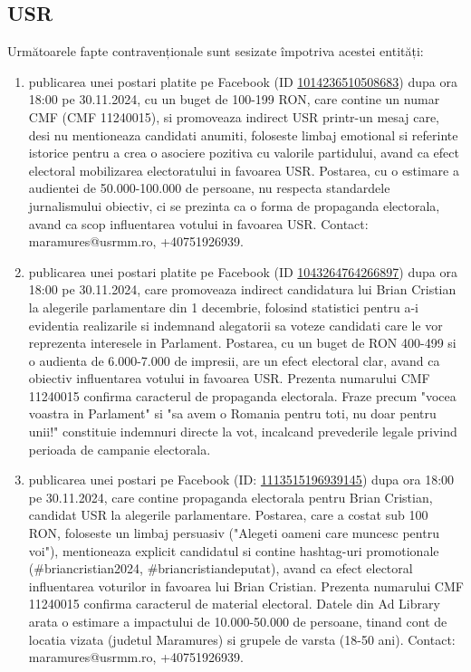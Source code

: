 \documentclass[a4paper,12pt]{article}
\begin{document}
\vspace{0.5cm}

\subsection{USR}
Următoarele fapte contravenționale sunt sesizate împotriva acestei entități:

\begin{enumerate}[leftmargin=*, label=\arabic*.)]
    \item publicarea unei postari platite pe Facebook (ID \href{https://www.facebook.com/ads/library/?id=1014236510508683}{1014236510508683}) dupa ora 18:00 pe 30.11.2024, cu un buget de 100-199 RON, care contine un numar CMF (CMF 11240015),  si promoveaza indirect USR printr-un mesaj care, desi nu mentioneaza candidati anumiti,  foloseste limbaj emotional si referinte istorice pentru a crea o asociere pozitiva cu valorile partidului, avand ca efect electoral mobilizarea electoratului in favoarea USR.  Postarea, cu o estimare a audientei de 50.000-100.000 de persoane,  nu respecta standardele jurnalismului obiectiv, ci se prezinta ca o forma de propaganda electorala, avand ca scop influentarea votului in favoarea USR.  Contact: maramures@usrmm.ro, +40751926939.
    \item publicarea unei postari platite pe Facebook (ID \href{https://www.facebook.com/ads/library/?id=1043264764266897}{1043264764266897}) dupa ora 18:00 pe 30.11.2024, care promoveaza indirect candidatura lui Brian Cristian la alegerile parlamentare din 1 decembrie, folosind statistici pentru a-i evidentia realizarile si indemnand alegatorii sa voteze candidati care le vor reprezenta interesele in Parlament.  Postarea, cu un buget de RON 400-499 si o audienta de 6.000-7.000 de impresii, are un efect electoral clar, avand ca obiectiv influentarea votului in favoarea USR. Prezenta numarului CMF 11240015 confirma caracterul de propaganda electorala.  Fraze precum "vocea voastra in Parlament" si "sa avem o Romania pentru toti, nu doar pentru unii!" constituie indemnuri directe la vot, incalcand prevederile legale privind perioada de campanie electorala.
    \item publicarea unei postari pe Facebook (ID: \href{https://www.facebook.com/ads/library/?id=1113515196939145}{1113515196939145}) dupa ora 18:00 pe 30.11.2024, care contine propaganda electorala pentru Brian Cristian, candidat USR la alegerile parlamentare. Postarea, care a costat sub 100 RON,  foloseste un limbaj persuasiv ("Alegeti oameni care muncesc pentru voi"),  mentioneaza explicit candidatul si contine hashtag-uri promotionale (\#briancristian2024, \#briancristiandeputat),  avand ca efect electoral influentarea voturilor in favoarea lui Brian Cristian. Prezenta numarului CMF 11240015 confirma caracterul de material electoral.  Datele din Ad Library arata o estimare a impactului de 10.000-50.000 de persoane,  tinand cont de locatia vizata (judetul Maramures) si grupele de varsta (18-50 ani).  Contact: maramures@usrmm.ro, +40751926939.

\end{enumerate}
\end{document}
